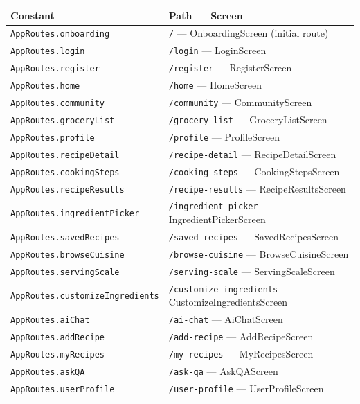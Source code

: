 \documentclass[11pt,a4paper]{article}
\begin{document}
\begin{center}
\begin{tabularx}{0.97\textwidth}{lX}
\toprule
\textbf{Constant} & \textbf{Path — Screen} \\
\midrule
\texttt{AppRoutes.onboarding}           & \texttt{/} — OnboardingScreen (initial route) \\
\texttt{AppRoutes.login}                & \texttt{/login} — LoginScreen \\
\texttt{AppRoutes.register}             & \texttt{/register} — RegisterScreen \\
\texttt{AppRoutes.home}                 & \texttt{/home} — HomeScreen \\
\texttt{AppRoutes.community}            & \texttt{/community} — CommunityScreen \\
\texttt{AppRoutes.groceryList}          & \texttt{/grocery-list} — GroceryListScreen \\
\texttt{AppRoutes.profile}              & \texttt{/profile} — ProfileScreen \\
\texttt{AppRoutes.recipeDetail}         & \texttt{/recipe-detail} — RecipeDetailScreen \\
\texttt{AppRoutes.cookingSteps}         & \texttt{/cooking-steps} — CookingStepsScreen \\
\texttt{AppRoutes.recipeResults}        & \texttt{/recipe-results} — RecipeResultsScreen \\
\texttt{AppRoutes.ingredientPicker}     & \texttt{/ingredient-picker} — IngredientPickerScreen \\
\texttt{AppRoutes.savedRecipes}         & \texttt{/saved-recipes} — SavedRecipesScreen \\
\texttt{AppRoutes.browseCuisine}        & \texttt{/browse-cuisine} — BrowseCuisineScreen \\
\texttt{AppRoutes.servingScale}         & \texttt{/serving-scale} — ServingScaleScreen \\
\texttt{AppRoutes.customizeIngredients} & \texttt{/customize-ingredients} — CustomizeIngredientsScreen \\
\texttt{AppRoutes.aiChat}               & \texttt{/ai-chat} — AiChatScreen \\
\texttt{AppRoutes.addRecipe}            & \texttt{/add-recipe} — AddRecipeScreen \\
\texttt{AppRoutes.myRecipes}            & \texttt{/my-recipes} — MyRecipesScreen \\
\texttt{AppRoutes.askQA}                & \texttt{/ask-qa} — AskQAScreen \\
\texttt{AppRoutes.userProfile}          & \texttt{/user-profile} — UserProfileScreen \\
\bottomrule
\end{tabularx}
\end{center}
\end{document}

